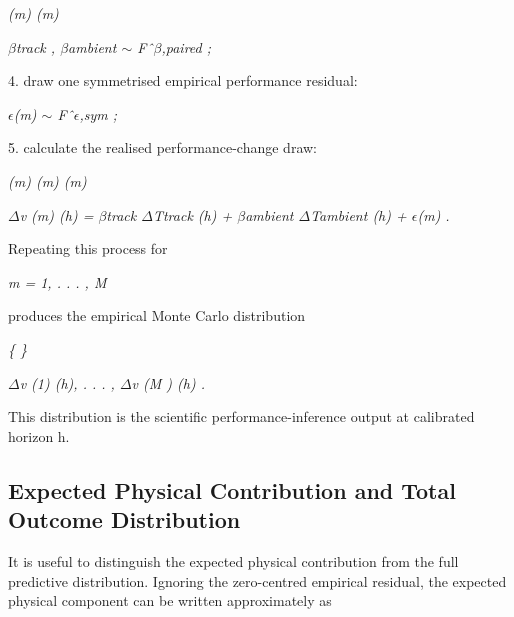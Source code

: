 \begin{center}\textit{(m)      (m)}\end{center}

\begin{center}\textit{\ensuremath{\beta}track , \ensuremath{\beta}ambient \ensuremath{\sim} Fˆ\ensuremath{\beta},paired ;}\end{center}

4. draw one symmetrised empirical performance residual:

\begin{center}\textit{\ensuremath{\epsilon}(m) \ensuremath{\sim} Fˆ\ensuremath{\epsilon},sym ;}\end{center}

5. calculate the realised performance-change draw:

\begin{center}\textit{(m)         (m)              (m)}\end{center}

\begin{center}\textit{\ensuremath{\Delta}v (m) (h) = \ensuremath{\beta}track \ensuremath{\Delta}Ttrack (h) + \ensuremath{\beta}ambient \ensuremath{\Delta}Tambient (h) + \ensuremath{\epsilon}(m) .}\end{center}

Repeating this process for

\begin{center}\textit{m = 1, . . . , M}\end{center}

produces the empirical Monte Carlo distribution

\begin{center}\textit{\{                               \}}\end{center}

\begin{center}\textit{\ensuremath{\Delta}v (1) (h), . . . , \ensuremath{\Delta}v (M ) (h) .}\end{center}

This distribution is the scientific performance-inference output at calibrated horizon h.

\subsection{Expected Physical Contribution and Total Outcome Distribution}
It is useful to distinguish the expected physical contribution from the full predictive distribution. Ignoring the zero-centred empirical residual, the expected physical component can be written approximately as

